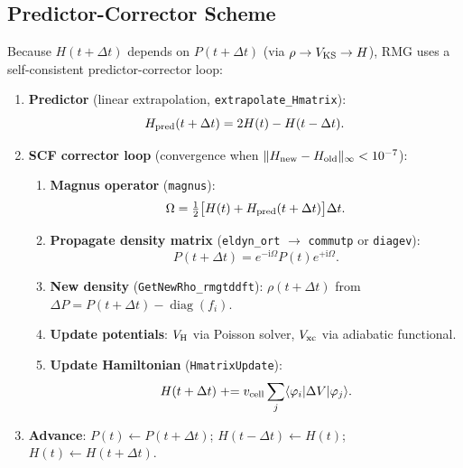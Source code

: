 \documentclass[12pt,letterpaper]{article}
\newcommand{\mel}[3]{\langle #1 \vert #2 \vert #3 \rangle}
\newcommand{\ii}{\mathrm{i}}
\begin{document}
\subsection{Predictor-Corrector Scheme}
\label{sec:predictor}

Because $H(t+\Delta t)$ depends on $P(t+\Delta t)$ (via $\rho\to V_{\rm KS}\to H$),
RMG uses a self-consistent predictor-corrector loop:

\begin{enumerate}[label=\textbf{Step \arabic*.}, leftmargin=*, itemsep=4pt]
  \item \textbf{Predictor} (linear extrapolation, \texttt{extrapolate\_Hmatrix}):
    \begin{equation}
      H_{\rm pred}(t+\Delta t) = 2H(t) - H(t-\Delta t).
      \label{eq:extrapolate}
    \end{equation}

  \item \textbf{SCF corrector loop} (convergence when
    $\|H_{\rm new}-H_{\rm old}\|_\infty < 10^{-7}$):
    \begin{enumerate}[label=(\alph*), itemsep=2pt]
      \item \textbf{Magnus operator} (\texttt{magnus}):
        \begin{equation}
          \Omega = \tfrac{1}{2}\bigl[H(t) + H_{\rm pred}(t+\Delta t)\bigr]\Delta t.
          \label{eq:magnus_step}
        \end{equation}
      \item \textbf{Propagate density matrix} (\texttt{eldyn\_ort} $\to$ \texttt{commutp}
        or \texttt{diagev}):
        \begin{equation}
          P(t+\Delta t) = e^{-\ii\Omega}P(t)e^{+\ii\Omega}.
          \label{eq:propagate}
        \end{equation}
      \item \textbf{New density} (\texttt{GetNewRho\_rmgtddft}):
        $\rho(t+\Delta t)$ from $\Delta P = P(t+\Delta t)-\operatorname{diag}(f_i)$.
      \item \textbf{Update potentials}: $V_{\rm H}$ via Poisson solver,
        $V_{\rm xc}$ via adiabatic functional.
      \item \textbf{Update Hamiltonian} (\texttt{HmatrixUpdate}):
        \begin{equation}
          H(t+\Delta t) \mathrel{+}= v_{\rm cell}\sum_j\mel{\varphi_i}{\Delta V}{\varphi_j}.
        \end{equation}
    \end{enumerate}

  \item \textbf{Advance}: $P(t) \leftarrow P(t+\Delta t)$;
    $H(t-\Delta t) \leftarrow H(t)$; $H(t) \leftarrow H(t+\Delta t)$.
\end{enumerate}
\end{document}
